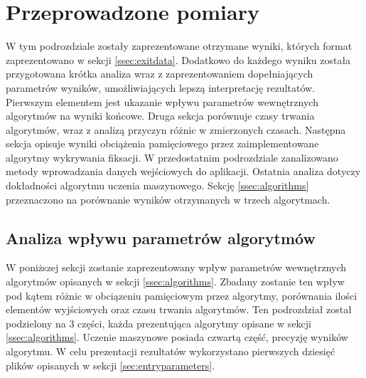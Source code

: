 \section{Przeprowadzone pomiary}
W tym podrozdziale zostały zaprezentowane otrzymane wyniki, których format zaprezentowano w sekcji \ref{ssec:exitdata}. Dodatkowo do każdego wyniku została przygotowana krótka analiza wraz z zaprezentowaniem dopełniających parametrów wyników, umożliwiających lepszą interpretację rezultatów. Pierwszym elementem jest ukazanie wpływu parametrów wewnętrznych algorytmów na wyniki końcowe. Druga sekcja porównuje czasy trwania algorytmów, wraz z analizą przyczyn różnic w zmierzonych czasach. Następna sekcja opisuje wyniki obciążenia pamięciowego przez zaimplementowane algorytmy wykrywania fiksacji. W przedostatnim podrozdziale zanalizowano metody wprowadzania danych wejściowych do aplikacji. Ostatnia analiza dotyczy dokładności algorytmu uczenia maszynowego. Sekcję \ref{ssec:algorithms} przeznaczono na porównanie wyników otrzymanych w trzech algorytmach.
\subsection{Analiza wpływu parametrów algorytmów}
\label{ssec:queryparameters}
W poniższej sekcji zostanie zaprezentowany wpływ parametrów wewnętrznych algorytmów opisanych w sekcji \ref{ssec:algorithms}. Zbadany zostanie ten wpływ pod kątem różnic w obciązeniu pamięciowym przez algorytmy, porównania ilości elementów wyjściowych oraz czasu trwania algorytmów. Ten podrozdział został podzielony na 3 części, każda prezentująca algorytmy opisane w sekcji \ref{ssec:algorithms}. Uczenie maszynowe posiada czwartą część, precyzję wyników algorytmu. W celu prezentacji rezultatów wykorzystano pierwszych dziesięć plików opisanych w sekcji \ref{sec:entryparameters}.
